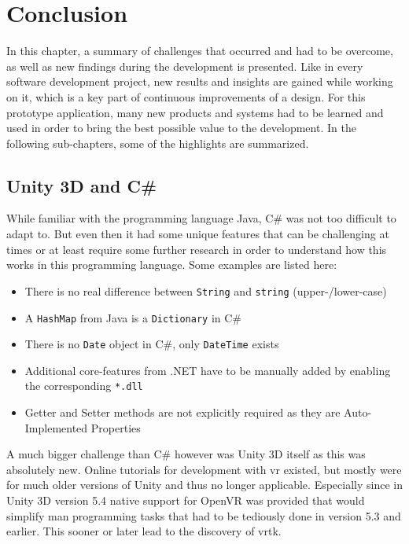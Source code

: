 
\section{Conclusion}

In this chapter, a summary of challenges that occurred and had to be overcome, as well as new findings during the development is presented. Like in every software development project, new results and insights are gained while working on it, which is a key part of continuous improvements of a design. For this prototype application, many new products and systems had to be learned and used in order to bring the best possible value to the development. In the following sub-chapters, some of the highlights are summarized.


\subsection{Unity 3D and C\#}

While familiar with the programming language Java, C\# was not too difficult to adapt to. But even then it had some unique features that can be challenging at times or at least require some further research in order to understand how this works in this programming language. Some examples are listed here:
\begin{itemize}[noitemsep,nolistsep]
	\item There is no real difference between \texttt{String} and \texttt{string} (upper-/lower-case)
	\item A \texttt{HashMap} from Java is a \texttt{Dictionary} in C\#
	\item There is no \texttt{Date} object in C\#, only \texttt{DateTime} exists
	\item Additional core-features from .NET have to be manually added by enabling the corresponding \texttt{*.dll}
	\item Getter and Setter methods are not explicitly required as they are Auto-Implemented Properties
\end{itemize}
A much bigger challenge than C\# however was Unity 3D itself as this was absolutely new. Online tutorials for development with \gls{vr} existed, but mostly were for much older versions of Unity and thus no longer applicable. Especially since in Unity 3D version 5.4 native support for OpenVR was provided that would simplify man programming tasks that had to be tediously done in version 5.3 and earlier. This sooner or later lead to the discovery of \gls{vrtk}.


